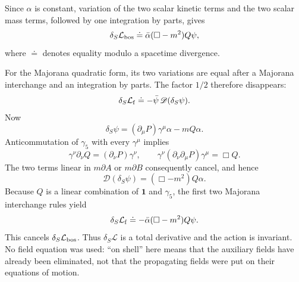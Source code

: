 \begin{enumerate}
  Since \(\alpha\) is constant, variation of the two scalar kinetic terms
  and the two scalar mass terms, followed by one integration by parts, gives
  \[
    \delta_S\mathcal L_{\rm bos}
      \doteq \bar\alpha(\Box-m^2)Q\psi,
  \]
  where \(\doteq\) denotes equality modulo a spacetime divergence.

  For the Majorana quadratic form, its two variations are equal after a
  Majorana interchange and an integration by parts.  The factor \(1/2\)
  therefore disappears:
  \[
    \delta_S\mathcal L_{\rm f}
      \doteq-\bar\psi\,\mathscr D(\delta_S\psi).
  \]
  Now
  \[
    \delta_S\psi=(\partial_\mu P)\gamma^\mu\alpha-mQ\alpha.
  \]
  Anticommutation of \(\gamma_5\) with every \(\gamma^\mu\) implies
  \[
    \gamma^\nu\partial_\nu Q=(\partial_\nu P)\gamma^\nu,
    \qquad
    \gamma^\nu(\partial_\nu\partial_\mu P)\gamma^\mu
      =\Box Q.
  \]
  The two terms linear in \(m\partial A\) or \(m\partial B\) consequently
  cancel, and hence
  \[
    \mathscr D(\delta_S\psi)=(\Box-m^2)Q\alpha.
  \]
  Because \(Q\) is a linear combination of \(\mathbf 1\) and \(\gamma_5\),
  the first two Majorana interchange rules yield
  \[
    \delta_S\mathcal L_{\rm f}
      \doteq-\bar\alpha(\Box-m^2)Q\psi.
  \]
  This cancels \(\delta_S\mathcal L_{\rm bos}\).  Thus
  \(\delta_S\mathcal L\) is a total derivative and the action is invariant.
  No field equation was used: ``on shell'' here means that the auxiliary
  fields have already been eliminated, not that the propagating fields were
  put on their equations of motion.


\end{enumerate}
